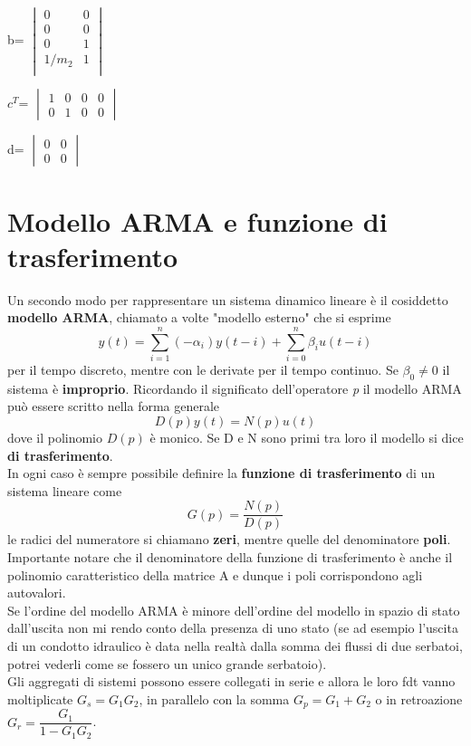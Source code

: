 \documentclass[a4paper]{article}
\begin{document}
\bigskip 	b=
	$\begin{vmatrix}
	0 & 0 \\
	0 & 0 \\
	0 & 1 \\
	1/m_2 & 1 \\
	\end{vmatrix}
	$
	
	
\bigskip 	$c^T$=
	$\begin{vmatrix}
	1 & 0 & 0 & 0 \\
	0 & 1 & 0 & 0 
	\end{vmatrix}
	$
	
\bigskip 	d=
	$\begin{vmatrix}
	0 & 0 \\
	0 & 0
	\end{vmatrix}
	$
	
	\section{Modello ARMA e funzione di trasferimento}
	Un secondo modo per rappresentare un sistema dinamico lineare è il cosiddetto \textbf{modello ARMA}, chiamato a volte "modello esterno" che si esprime \[y(t)=\sum_{i=1}^{n}(-\alpha_i)y(t-i)+\sum_{i=0}^{n}\beta_iu(t-i)\] per il tempo discreto, mentre con le derivate per il tempo continuo. Se $\beta_0\ne0$ il sistema è \textbf{improprio}. Ricordando il significato dell'operatore \emph{p} il modello ARMA può essere scritto nella forma generale \[D(p)y(t)=N(p)u(t)\] 
	dove il polinomio $D(p)$ è monico. Se D e N sono primi tra loro il modello si dice \textbf{di trasferimento}. \\ In ogni caso è sempre possibile definire la \textbf{funzione di trasferimento} di un sistema lineare come \[G(p)=\frac{N(p)}{D(p)}\] le radici del numeratore si chiamano \textbf{zeri}, mentre quelle del denominatore \textbf{poli}. Importante notare che il denominatore della funzione di trasferimento è anche il polinomio caratteristico della matrice A e dunque i poli corrispondono agli autovalori.
	\\ Se l'ordine del modello ARMA è minore dell'ordine del modello in spazio di stato dall'uscita non mi rendo conto della presenza di uno stato (se ad esempio l'uscita di un condotto idraulico è data nella realtà dalla somma dei flussi di due serbatoi, potrei vederli come se fossero un unico grande serbatoio).
	\\Gli aggregati di sistemi possono essere collegati in serie e allora le loro fdt vanno moltiplicate $G_s=G_1G_2$, in parallelo con la somma $G_p=G_1+G_2$ o in retroazione $G_r=\dfrac{G_1}{1-G_1G_2}$.
	
\end{document}

